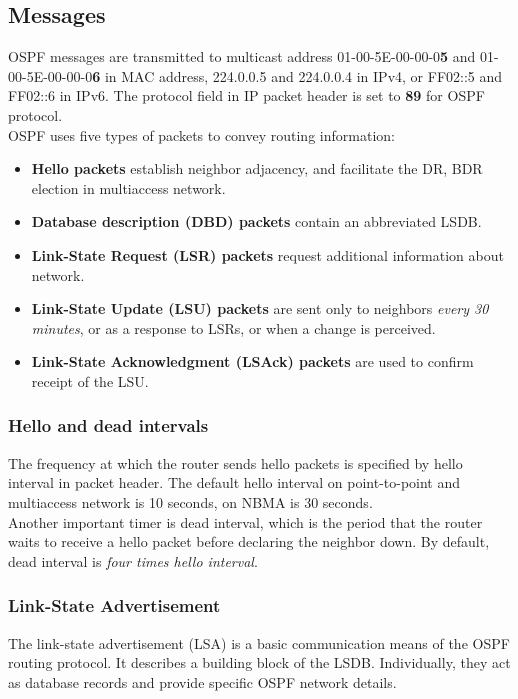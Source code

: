 \subsection{Messages}

OSPF messages are transmitted to multicast address 01-00-5E-00-00-0\textbf{5} and 01-00-5E-00-00-0\textbf{6} in MAC address, 224.0.0.5 and 224.0.0.4 in IPv4, or FF02::5 and FF02::6 in IPv6. The protocol field in IP packet header is set to \textbf{89} for OSPF protocol.\\

OSPF uses five types of packets to convey routing information:
\begin{itemize}
	\item \textbf{Hello packets} establish neighbor adjacency, and facilitate the DR, BDR election in multiaccess network.
	\item \textbf{Database description (DBD) packets} contain an abbreviated LSDB.
	\item \textbf{Link-State Request (LSR) packets} request additional information about network.
	\item \textbf{Link-State Update (LSU) packets} are sent only to neighbors \emph{every 30 minutes}, or as a response to LSRs, or when a change is perceived.
	\item \textbf{Link-State Acknowledgment (LSAck) packets} are used to confirm receipt of the LSU.
\end{itemize}

\subsubsection{Hello and dead intervals}

The frequency at which the router sends hello packets is specified by hello interval in packet header. The default hello interval on point-to-point and multiaccess network is 10 seconds, on NBMA is 30 seconds.\\

Another important timer is dead interval, which is the period that the router waits to receive a hello packet before declaring the neighbor down. By default, dead interval is \emph{four times hello interval}.

\subsubsection{Link-State Advertisement}

The link-state advertisement (LSA) is a basic communication means of the OSPF routing protocol. It describes a building block of the LSDB. Individually, they act as database records and provide specific OSPF network details.\\
 
